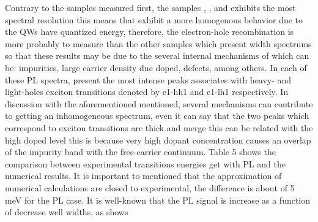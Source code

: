 Contrary to the samples measured first, the samples , , and  exhibits the most spectral resolution this means that exhibit a more homogenous behavior  due to the QWs have quantized energy, therefore, the electron-hole recombination is more probably to measure than the other samples which present width spectrums so that these results may be due to the several internal mechanisms of which can be: impurities, large carrier density due doped,  defects, among others\cite{khmissi2010effectcarriers,kundrotas2005excitonic}. In each of these PL spectra,  present the most intense peaks associates with heavy- and light-holes exciton transitions denoted by e1-hh1 and e1-lh1 respectively.  In discussion with the aforementioned mentioned, several mechanisms can contribute to getting an inhomogeneous spectrum, even it can say that the two peaks which correspond to exciton transitions are thick and merge this can be related with the high doped level this is because very high dopant concentration causes an overlap of the impurity band with the free-carrier continuum\cite{kundrotas2005excitonic}. Table 5 shows the comparison between experimental transitions energies get with PL and the numerical results. It is important to mentioned that the approximation of numerical calculations are closed to experimental, the difference  is about of 5 meV for the PL case. It is well-known that the PL signal is increase as a function of decrease well widths, as shows 





